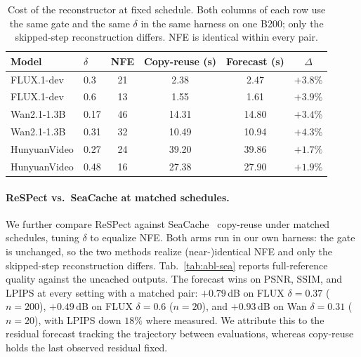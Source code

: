 \begin{table}[h]
  \centering
  \caption{Cost of the reconstructor at fixed schedule. Both columns of each
  row use the same gate and the same $\delta$ in the same harness on one
  B200; only the skipped-step reconstruction differs. NFE is identical
  within every pair.}
  \label{tab:overhead}
  \vspace{0.1cm}
  {\small\setlength{\tabcolsep}{5pt}
  \begin{tabular}{llcccc}
    \toprule
    Model & $\delta$ & NFE & Copy-reuse (s) & Forecast (s) & $\Delta$ \\
    \midrule
    FLUX.1-dev   & 0.3  & 21 & 2.38  & 2.47  & $+3.8\%$ \\
    FLUX.1-dev   & 0.6  & 13 & 1.55  & 1.61  & $+3.9\%$ \\
    Wan2.1-1.3B  & 0.17 & 46 & 14.31 & 14.80 & $+3.4\%$ \\
    Wan2.1-1.3B  & 0.31 & 32 & 10.49 & 10.94 & $+4.3\%$ \\
    HunyuanVideo & 0.27 & 24 & 39.20 & 39.86 & $+1.7\%$ \\
    HunyuanVideo & 0.48 & 16 & 27.38 & 27.90 & $+1.9\%$ \\
    \bottomrule
  \end{tabular}}
\end{table}

\paragraph{ReSPect vs.\ SeaCache at matched schedules.}
We further compare ReSPect against SeaCache~\citep{seacache} copy-reuse
under matched schedules, tuning $\delta$ to equalize NFE. Both arms run
in our own harness: the gate is unchanged, so the two methods realize
(near-)identical NFE and only the skipped-step reconstruction differs.
Tab.~\ref{tab:abl-sea} reports full-reference quality against the
uncached outputs. The forecast wins on PSNR, SSIM, and LPIPS at every
setting with a matched pair: $+0.79$\,dB on FLUX $\delta{=}0.37$
($n{=}200$), $+0.49$\,dB on FLUX $\delta{=}0.6$ ($n{=}20$), and
$+0.93$\,dB on Wan $\delta{=}0.31$ ($n{=}20$), with LPIPS down $18\%$
where measured. We attribute this to the residual forecast tracking
the trajectory between evaluations, whereas copy-reuse holds the last
observed residual fixed.

